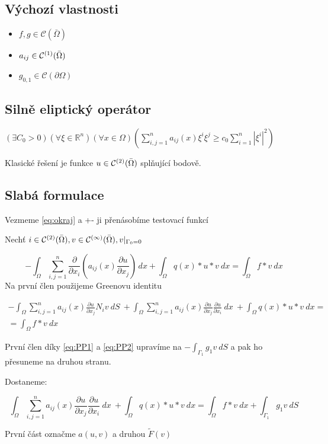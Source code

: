 \documentclass[../main.tex]{subfiles}
\begin{document}
\subsection{Výchozí vlastnosti}
\begin{itemize}
    \item $f, g \in \mathcal{C}(\bar{\Omega})$
    \item $a_{ij} \in \continuous[\bar{\Omega}]{1}$
    \item $g_{0,1} \in \mathcal{C}(\partial\Omega)$
\end{itemize}


\subsection{Silně eliptický operátor}
$(\exists C_0 > 0)(\forall \xi \in \mathbb{R}^n) (\forall x \in \Omega) (\sum_{i,j =1}^{n} a_{ij}(x)\xi^i \xi^j \geq c_0 \sum_{i = 1}^{n}|\xi^i|^2)$


Klasické řešení  je funkce $u\in\continuous[\bar{\Omega}]{2}$ splňující  bodově. 

\subsection{Slabá formulace}\label{SlabaFormulace}
Vezmeme \ref{eq:okraj} a +- ji přenásobíme testovací funkcí 

Nechť $i\in \closedcontinuous{2}, v\in\closedcontinuous{\infty}, v|_{\Gamma_0 = 0}$

\begin{equation}
    - \int_\Omega \sum_{i,j = 1}^{n} \frac{\partial}{\partial x_i} \left ( a_{ij}(x) \frac{\partial u}{\partial x_j}\right ) \, dx + \int_\Omega q(x)*u*v \ dx = \int_\Omega f*v \ dx 
\end{equation}
Na první člen použijeme Greenovu identitu

\begin{multline}
    - \int_\Omega \sum_{i,j = 1}^{n}a_{ij}(x) \frac{\partial u }{\partial x_j} N_i v \ dS \
    + \int_\Omega \sum_{i,j = 1}^{n}a_{ij}(x)\frac{\partial u }{\partial x_j}\frac{\partial u }{\partial x_i}\ dx \
    + \int_\Omega q(x)*u*v \ dx =\\= \int_\Omega f*v \ dx 
\end{multline}

První člen díky \eqref{eq:PP1} a \eqref{eq:PP2} upravíme na $- \int_{\Gamma_1} g_1 v \ dS$ a pak ho přesuneme na druhou stranu. 

Dostaneme: 

\begin{equation}
    \int_\Omega \sum_{i,j = 1}^{n}a_{ij}(x)\frac{\partial u }{\partial x_j}\frac{\partial u }{\partial x_i}\ dx \
    + \int_\Omega q(x)*u*v \ dx = \int_\Omega f*v \ dx + \int_{\Gamma_1} g_1 v \ dS
\end{equation}

První část označme $a(u,v)$ a druhou $\tilde{F}(v)$
\end{document}
